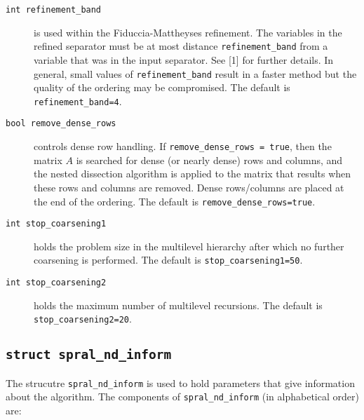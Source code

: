 \begin{description}
\item[\texttt{int refinement\_band}] is used within the 
Fiduccia-Mattheyses refinement. The variables in the refined separator must be 
at most distance {\tt refinement\_band} from a variable that was in the input 
separator. See [1] for further details. In general, small 
values of {\tt refinement\_band} result in a faster method but the quality of 
the ordering may be compromised. The default is {\tt refinement\_band=4}.

\item[\texttt{bool remove\_dense\_rows}] controls dense row handling.
If {\tt remove\_dense\_rows = true}, 
then the matrix $A$ is searched for dense (or nearly dense) rows and columns, 
and the nested dissection algorithm is applied to the matrix that results when 
these rows and columns are removed. Dense rows/columns are placed at the end of
the ordering. The default is {\tt remove\_dense\_rows=true}.

\item[\texttt{int stop\_coarsening1}] holds the problem size in the multilevel hierarchy after which no further coarsening is performed.
The default is {\tt stop\_coarsening1=50}.

\item[\texttt{int stop\_coarsening2}] holds the maximum number
of multilevel recursions.  
The default is {\tt stop\_coarsening2=20}.

\end{description}




\subsection{\texttt{struct spral\_nd\_inform}}
\label{nd:type:inform}
The strucutre {\tt spral\_nd\_inform}
is used to hold parameters that give information about the algorithm. The 
components of {\tt spral\_nd\_inform}
(in alphabetical order) are:

